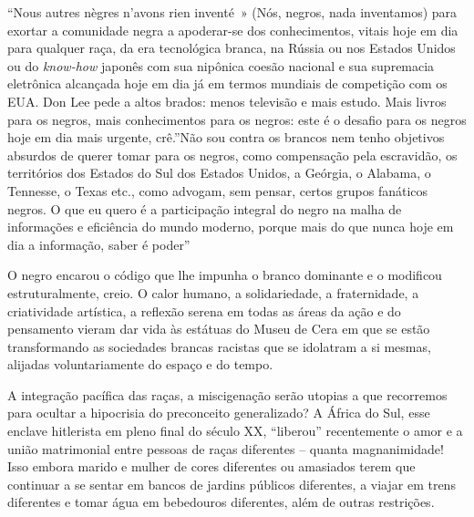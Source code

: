 \documentclass[
  letterpaper,
  DIV=11,
  numbers=noendperiod]{scrreprt}
\begin{document}
``Nous autres nègres n'avons rien inventé~» (Nós, negros, nada
inventamos) para exortar a comunidade negra a apoderar-se dos
conhecimentos, vitais hoje em dia para qualquer raça, da era tecnológica
branca, na Rússia ou nos Estados Unidos ou do \emph{know-how} japonês
com sua nipônica coesão nacional e sua supremacia eletrônica alcançada
hoje em dia já em termos mundiais de competição com os EUA. Don Lee pede
a altos brados: menos televisão e mais estudo. Mais livros para os
negros, mais conhecimentos para os negros: este é o desafio para os
negros hoje em dia mais urgente, crê.''Não sou contra os brancos nem
tenho objetivos absurdos de querer tomar para os negros, como
compensação pela escravidão, os territórios dos Estados do Sul dos
Estados Unidos, a Geórgia, o Alabama, o Tennesse, o Texas etc., como
advogam, sem pensar, certos grupos fanáticos negros. O que eu quero é a
participação integral do negro na malha de informações e eficiência do
mundo moderno, porque mais do que nunca hoje em dia a informação, saber
é poder''

O negro encarou o código que lhe impunha o branco dominante e o
modificou estruturalmente, creio. O calor humano, a solidariedade, a
fraternidade, a criatividade artística, a reflexão serena em todas as
áreas da ação e do pensamento vieram dar vida às estátuas do Museu de
Cera em que se estão transformando as sociedades brancas racistas que se
idolatram a si mesmas, alijadas voluntariamente do espaço e do tempo.

A integração pacífica das raças, a miscigenação serão utopias a que
recorremos para ocultar a hipocrisia do preconceito generalizado? A
África do Sul, esse enclave hitlerista em pleno final do século XX,
``liberou'' recentemente o amor e a união matrimonial entre pessoas de
raças diferentes -- quanta magnanimidade! Isso embora marido e mulher de
cores diferentes ou amasiados terem que continuar a se sentar em bancos
de jardins públicos diferentes, a viajar em trens diferentes e tomar
água em bebedouros diferentes, além de outras restrições.
\end{document}
